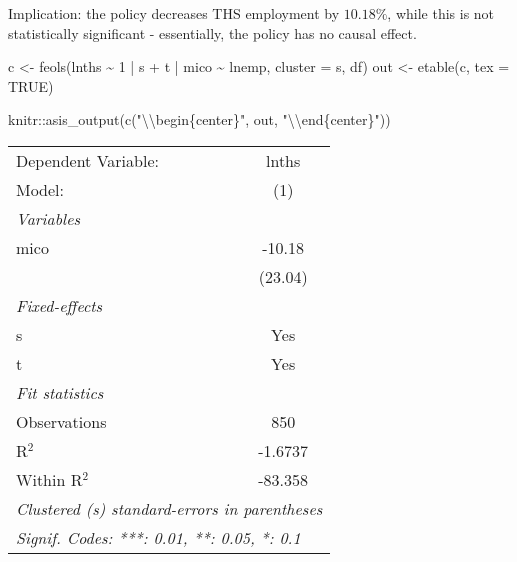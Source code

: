 \documentclass[
]{article}
\newenvironment{Shaded}{\begin{snugshade}}{\end{snugshade}}
\newcommand{\AttributeTok}[1]{\textcolor[rgb]{0.77,0.63,0.00}{#1}}
\newcommand{\ConstantTok}[1]{\textcolor[rgb]{0.00,0.00,0.00}{#1}}
\newcommand{\DecValTok}[1]{\textcolor[rgb]{0.00,0.00,0.81}{#1}}
\newcommand{\FunctionTok}[1]{\textcolor[rgb]{0.00,0.00,0.00}{#1}}
\newcommand{\NormalTok}[1]{#1}
\newcommand{\OtherTok}[1]{\textcolor[rgb]{0.56,0.35,0.01}{#1}}
\newcommand{\SpecialCharTok}[1]{\textcolor[rgb]{0.00,0.00,0.00}{#1}}
\newcommand{\StringTok}[1]{\textcolor[rgb]{0.31,0.60,0.02}{#1}}
\begin{document}
Implication: the policy decreases THS employment by \(10.18\%\), while
this is not statistically significant - essentially, the policy has no
causal effect.

\begin{Shaded}
\begin{Highlighting}[]
\NormalTok{c }\OtherTok{\textless{}{-}} \FunctionTok{feols}\NormalTok{(lnths }\SpecialCharTok{\textasciitilde{}} \DecValTok{1} \SpecialCharTok{|}\NormalTok{ s }\SpecialCharTok{+}\NormalTok{ t }\SpecialCharTok{|}\NormalTok{ mico }\SpecialCharTok{\textasciitilde{}}\NormalTok{ lnemp, }\AttributeTok{cluster =} \StringTok{\textquotesingle{}s\textquotesingle{}}\NormalTok{, df)}
\NormalTok{out }\OtherTok{\textless{}{-}} \FunctionTok{etable}\NormalTok{(c, }\AttributeTok{tex =} \ConstantTok{TRUE}\NormalTok{) }
\end{Highlighting}
\end{Shaded}

\begin{Shaded}
\begin{Highlighting}[]
\NormalTok{knitr}\SpecialCharTok{::}\FunctionTok{asis\_output}\NormalTok{(}\FunctionTok{c}\NormalTok{(}\StringTok{"}\SpecialCharTok{\textbackslash{}\textbackslash{}}\StringTok{begin\{center\}"}\NormalTok{, out, }\StringTok{"}\SpecialCharTok{\textbackslash{}\textbackslash{}}\StringTok{end\{center\}"}\NormalTok{)) }
\end{Highlighting}
\end{Shaded}

\begin{center}\begingroup\centering\begin{tabular}{lc}   \tabularnewline \midrule \midrule   Dependent Variable: & lnths\\     Model:              & (1)\\     \midrule   \emph{Variables}\\   mico                & -10.18\\                          & (23.04)\\      \midrule   \emph{Fixed-effects}\\   s                   & Yes\\     t                   & Yes\\     \midrule   \emph{Fit statistics}\\   Observations        & 850\\     R$^2$               & -1.6737\\     Within R$^2$        & -83.358\\     \midrule \midrule   \multicolumn{2}{l}{\emph{Clustered (s) standard-errors in parentheses}}\\   \multicolumn{2}{l}{\emph{Signif. Codes: ***: 0.01, **: 0.05, *: 0.1}}\\\end{tabular}\par\endgroup\end{center}
\end{document}

